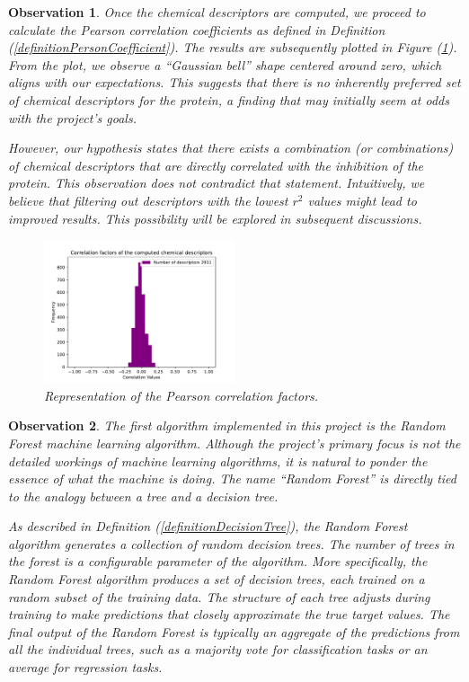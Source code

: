 \documentclass[12pt,letterpaper]{article}
\newtheorem{observation}{Observation}
\begin{document}
\begin{multicols}{2}
\begin{observation}\label{observationCorrelationFactor}
Once the chemical descriptors are computed, we proceed to calculate the Pearson correlation coefficients as defined in Definition (\ref{definitionPersonCoefficient}). The results are subsequently plotted in Figure (\ref{figPersonCorrelationFactors}). From the plot, we observe a “Gaussian bell” shape centered around zero, which aligns with our expectations. This suggests that there is no inherently preferred set of chemical descriptors for the protein, a finding that may initially seem at odds with the project’s goals.
        
However, our hypothesis states that \emph{there exists a combination (or combinations) of chemical descriptors that are directly correlated with the inhibition of the protein}. This observation does not contradict that statement. Intuitively, we believe that filtering out descriptors with the lowest  $r^2$  values might lead to improved results. This possibility will be explored in subsequent discussions.
\begin{figure}[H]
\centering
\includegraphics[width = 0.5\textwidth]{../Plots/ChEMBL_ExtractorData_CHEMBL372_IC50_1000CorrelationFactors.pdf}
\caption{Representation of the Pearson correlation factors.}
\label{figPersonCorrelationFactors}
\end{figure}
\end{observation}

\begin{observation}
The first algorithm implemented in this project is the \emph{Random Forest} machine learning algorithm. Although the project’s primary focus is not the detailed workings of machine learning algorithms, it is natural to ponder the essence of what the machine is doing. The name “Random Forest” is directly tied to the analogy between a tree and a decision tree. \par

As described in Definition (\ref{definitionDecisionTree}), the Random Forest algorithm generates a collection of random decision trees. The number of trees in the forest is a configurable parameter of the algorithm. More specifically, the Random Forest algorithm produces a set of decision trees, each trained on a random subset of the training data. The structure of each tree adjusts during training to make predictions that closely approximate the true target values. The final output of the Random Forest is typically an aggregate of the predictions from all the individual trees, such as a majority vote for classification tasks or an average for regression tasks. \par


\end{observation}
\end{multicols}
\end{document}
